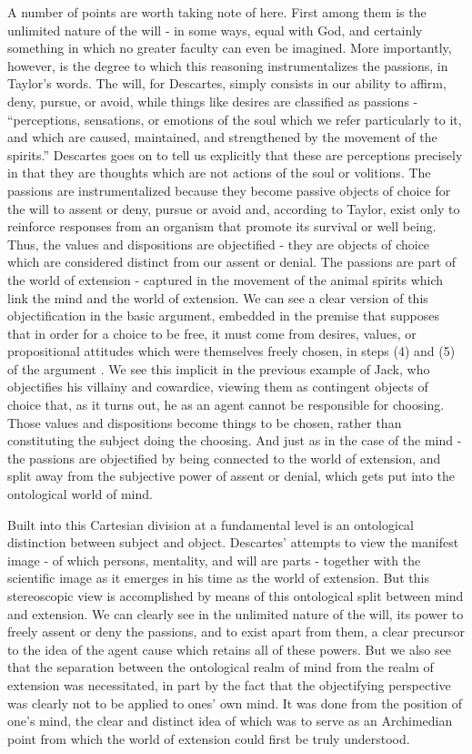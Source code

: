 \documentclass[phd,12pt,oneside,paper=letterpaper]{ubcthesis}
\begin{document}
A number of points are worth taking note of here. First among them is the unlimited nature of the will - in some ways, equal with God, and certainly something in which no greater faculty can even be imagined. More importantly, however, is the degree to which this reasoning instrumentalizes the passions, in Taylor's words. The will, for Descartes, simply consists in our ability to affirm, deny, pursue, or avoid, while things like desires are classified as passions - ``perceptions, sensations, or emotions of the soul which we refer particularly to it, and which are caused, maintained, and strengthened by the movement of the spirits.'' \citep[p.339]{descartes1984b} Descartes goes on to tell us explicitly that these are perceptions precisely in that they are thoughts which are not actions of the soul or volitions. The passions are instrumentalized because they become passive objects of choice for the will to assent or deny, pursue or avoid and, according to Taylor, exist only to reinforce responses from an organism that promote its survival or well being.  \citep[p.150]{taylor1989} Thus, the values and dispositions are objectified - they are objects of choice which are considered distinct from our assent or denial. The passions are part of the world of extension - captured in the movement of the animal spirits which link the mind and the world of extension. 
We can see a clear version of this objectification in the basic argument, embedded in the premise that supposes that in order for a choice to be free, it must come from desires, values, or propositional attitudes which were themselves freely chosen, in steps (4) and (5) of the argument \citep[p24-5]{strawsong2010}. We see this implicit in the previous example of Jack, who objectifies his villainy and cowardice, viewing them as contingent objects of choice that, as it turns out, he as an agent cannot be responsible for choosing. Those values and dispositions become things to be chosen, rather than constituting the subject doing the choosing. And just as in the case of the mind - the passions are objectified by being connected to the world of extension, and split away from the subjective power of assent or denial, which gets put into the ontological world of mind.

Built into this Cartesian division at a fundamental level is an ontological distinction between subject and object. Descartes' attempts to view the manifest image - of which persons, mentality, and will are parts - together with the scientific image as it emerges in his time as the world of extension. But this stereoscopic view is accomplished by means of this ontological split between mind and extension. We can clearly see in the unlimited nature of the will, its power to freely assent or deny the passions, and to exist apart from them, a clear precursor to the idea of the agent cause which retains all of these powers. But we also see that the separation between the ontological realm of mind from the realm of extension was necessitated, in part by the fact that the objectifying perspective was clearly not to be applied to ones' own mind. It was done from the position of one's mind, the clear and distinct idea of which was to serve as an Archimedian point from which the world of extension could first be truly understood.
\end{document}
